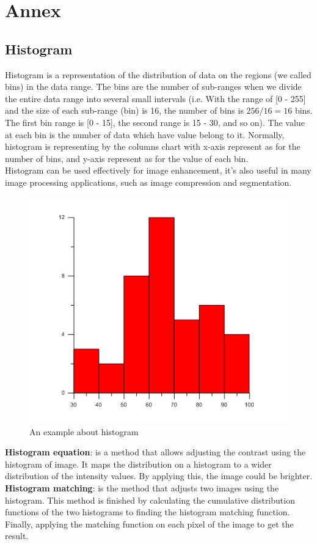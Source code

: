 \chapter*{Annex}
\section*{Histogram}
Histogram is a representation of the distribution of data on the regions (we called bins) in the data range. The bins are the number of sub-ranges when we divide the entire data range into several small intervals (i.e. With the range of [0 - 255] and the size of each sub-range (bin) is 16, the number of bins is $256/16 = 16$ bins. The first bin range is [0 - 15], the second range is {15 - 30}, and so on). The value at each bin is the number of data which have value belong to it. Normally, histogram is representing by the columns chart with x-axis represent as for the number of bins, and y-axis represent as for the value of each bin.\\
Histogram can be used effectively for image enhancement, it's also useful in many image processing applications, such as image compression and segmentation.\\[0.3cm]
\begin{figure}[h!]
\centering
\includegraphics[scale=2]{images/histogram}
\caption{An example about histogram}
\label{fig:figure_31}
\end{figure}
\textbf{Histogram equation}: is a method that allows adjusting the contrast using the histogram of image. It maps the distribution on a histogram to a wider distribution of the intensity values. By applying this, the image could be brighter.\\[0.2cm]
\textbf{Histogram matching}: is the method that adjusts two images using the histogram. This method is finished by calculating the cumulative distribution functions of the two histograms to finding the histogram matching function. Finally, applying the matching function on each pixel of the image to get the result.
